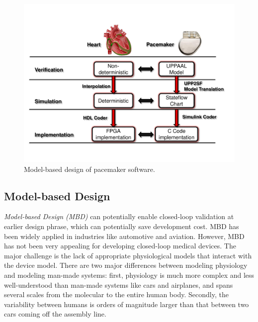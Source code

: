 \documentclass[a4paper]{article}
\begin{document}
\begin{figure}[t]
	\centering
	\includegraphics[scale=0.45]{figs/model_based_b.pdf}
	\caption{\small Model-based design of pacemaker software.}
	\label{fig:MBD}
\end{figure}
\subsection{Model-based Design}
\emph{Model-based Design (MBD)} can potentially enable closed-loop validation at earlier design phrase, which can potentially save development cost.
MBD has been widely applied in industries like automotive and aviation. 
However, MBD has not been very appealing for developing closed-loop medical devices.
The major challenge is the lack of appropriate physiological models that interact with the device model.
There are two major differences between modeling physiology and modeling man-made systems:
first, physiology is much more complex and less well-understood than man-made systems like cars and airplanes, and spans several scales from the molecular to the entire human body.
Secondly, the variability between humans is orders of magnitude larger than that between two cars coming off the assembly line.

\end{document}
